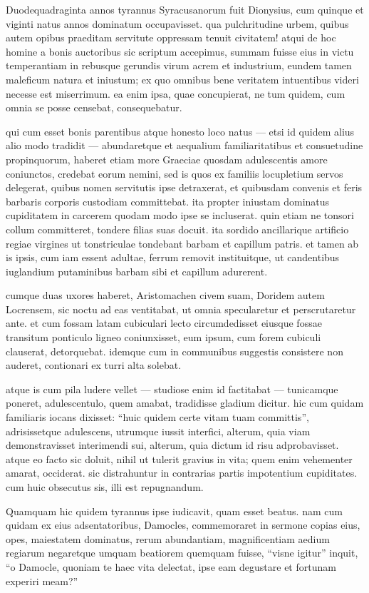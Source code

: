 
Duodequadraginta annos tyrannus Syracusanorum fuit Dionysius, cum quinque et viginti natus annos dominatum occupavisset. qua pulchritudine urbem, quibus autem opibus praeditam servitute oppressam tenuit civitatem! atqui de hoc homine a bonis auctoribus sic scriptum accepimus, summam fuisse eius in victu temperantiam in rebusque gerundis virum acrem et industrium, eundem tamen maleficum natura et iniustum; ex quo omnibus bene veritatem intuentibus videri necesse est miserrimum. ea enim ipsa, quae concupierat, ne tum quidem, cum omnia se posse censebat, consequebatur.

qui cum esset bonis parentibus atque honesto loco natus — etsi id quidem alius alio modo tradidit — abundaretque et aequalium familiaritatibus et consuetudine propinquorum, haberet etiam more Graeciae quosdam adulescentis amore coniunctos, credebat eorum nemini, sed is quos ex familiis locupletium servos delegerat, quibus nomen servitutis ipse detraxerat, et quibusdam convenis et feris barbaris corporis custodiam committebat. ita propter iniustam dominatus cupiditatem in carcerem quodam modo ipse se incluserat. quin etiam ne tonsori collum committeret, tondere filias suas docuit. ita sordido ancillarique artificio regiae virgines ut tonstriculae tondebant barbam et capillum patris. et tamen ab is ipsis, cum iam essent adultae, ferrum removit instituitque, ut candentibus iuglandium putaminibus barbam sibi et capillum adurerent.

cumque duas uxores haberet, Aristomachen civem suam, Doridem autem Locrensem, sic noctu ad eas ventitabat, ut omnia specularetur et perscrutaretur ante. et cum fossam latam cubiculari lecto circumdedisset eiusque fossae transitum ponticulo ligneo coniunxisset, eum ipsum, cum forem cubiculi clauserat, detorquebat. idemque cum in communibus suggestis consistere non auderet, contionari ex turri alta solebat.

atque is cum pila ludere vellet — studiose enim id factitabat — tunicamque poneret, adulescentulo, quem amabat, tradidisse gladium dicitur. hic cum quidam familiaris iocans dixisset: ``huic quidem certe vitam tuam committis'', adrisissetque adulescens, utrumque iussit interfici, alterum, quia viam demonstravisset interimendi sui, alterum, quia dictum id risu adprobavisset. atque eo facto sic doluit, nihil ut tulerit gravius in vita; quem enim vehementer amarat, occiderat. sic distrahuntur in contrarias partis impotentium cupiditates. cum huic obsecutus sis, illi est repugnandum.

Quamquam hic quidem tyrannus ipse iudicavit, quam esset beatus. nam cum quidam ex eius adsentatoribus, Damocles, commemoraret in sermone copias eius, opes, maiestatem dominatus, rerum abundantiam, magnificentiam aedium regiarum negaretque umquam beatiorem quemquam fuisse, ``visne igitur'' inquit, ``o Damocle, quoniam te haec vita delectat, ipse eam degustare et fortunam experiri meam?''

